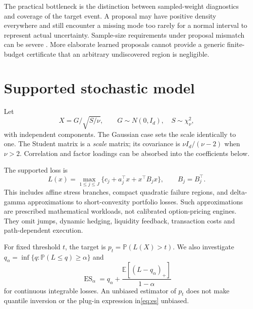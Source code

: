 \documentclass[11pt]{article}
\newcommand{\E}{\mathbb E}
\newcommand{\Pp}{\mathbb P}
\begin{document}
The practical bottleneck is the distinction between sampled-weight diagnostics and coverage of the target event. A proposal may have positive density everywhere and still encounter a missing mode too rarely for a normal interval to represent actual uncertainty. Sample-size requirements under proposal mismatch can be severe \citep{chatterjee2018}. More elaborate learned proposals cannot provide a generic finite-budget certificate that an arbitrary undiscovered region is negligible.

\section{Supported stochastic model}
Let
\begin{equation}
 X=G/\sqrt{S/\nu},\qquad G\sim N(0,I_d),\quad S\sim\chi^2_\nu,
 \label{eq:student}
\end{equation}
with independent components. The Gaussian case sets the scale identically to one. The Student matrix is a \emph{scale} matrix; its covariance is $\nu I_d/(\nu-2)$ when $\nu>2 $. Correlation and factor loadings can be absorbed into the coefficients below.

The supported loss is
\begin{equation}
 L(x)=\max_{1\le j\le J}\{c_j+a_j^\top x+x^\top B_jx\},\qquad B_j=B_j^\top.
 \label{eq:loss}
\end{equation}
This includes affine stress branches, compact quadratic failure regions, and delta-gamma approximations to short-convexity portfolio losses. Such approximations are prescribed mathematical workloads, not calibrated option-pricing engines. They omit jumps, dynamic hedging, liquidity feedback, transaction costs and path-dependent execution.

For fixed threshold $ t $, the target is $ p_t=\Pp(L(X)>t)$. We also investigate $ q_\alpha=\inf\{q:\Pp(L\le q)\ge\alpha\}$ and
\begin{equation}
 \operatorname{ES}_\alpha=q_\alpha+\frac{\E[(L-q_\alpha)_+]}{1-\alpha}
 \label{eq:es}
\end{equation}
for continuous integrable losses. An unbiased estimator of $ p_t $ does not make quantile inversion or the plug-in expression in\eqref{eq:es} unbiased.
\end{document}
